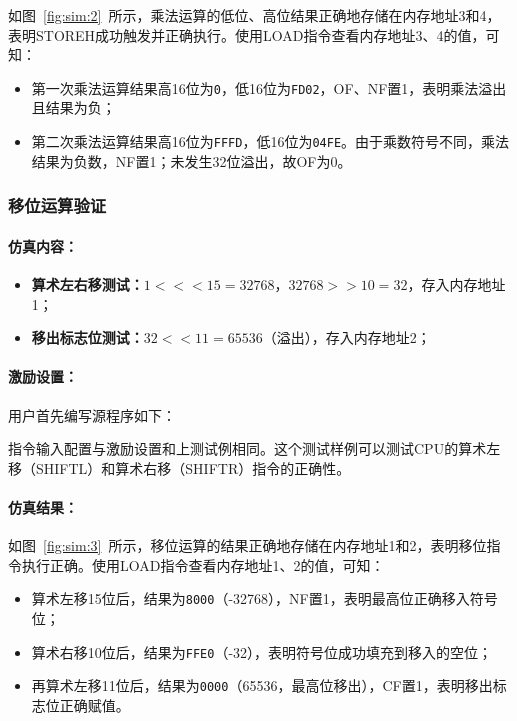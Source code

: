\documentclass[lang=cn,a4paper,newtx]{elegantpaper}
\begin{document}
如图~\ref{fig:sim:2}~所示，乘法运算的低位、高位结果正确地存储在内存地址3和4，表明STOREH成功触发并正确执行。使用LOAD指令查看内存地址3、4的值，可知：
\begin{itemize}
  \item 第一次乘法运算结果高16位为\texttt{0}，低16位为\texttt{FD02}，OF、NF置1，表明乘法溢出且结果为负；
  \item 第二次乘法运算结果高16位为\texttt{FFFD}，低16位为\texttt{04FE}。由于乘数符号不同，乘法结果为负数，NF置1；未发生32位溢出，故OF为0。
\end{itemize}
\subsubsection{移位运算验证}
\paragraph{仿真内容：}
\begin{itemize}
  \item \textbf{算术左右移测试：}$1 <<< 15 = 32768$，$32768 >> 10 = 32$，存入内存地址1；
  \item \textbf{移出标志位测试：}$32 << 11 = 65536$（溢出），存入内存地址2；
\end{itemize}



\paragraph{激励设置：}

用户首先编写源程序如下：


指令输入配置与激励设置和上测试例相同。这个测试样例可以测试CPU的算术左移（SHIFTL）和算术右移（SHIFTR）指令的正确性。

\paragraph{仿真结果：}

如图~\ref{fig:sim:3}~所示，移位运算的结果正确地存储在内存地址1和2，表明移位指令执行正确。使用LOAD指令查看内存地址1、2的值，可知：
\begin{itemize}
  \item 算术左移15位后，结果为\texttt{8000}（-32768），NF置1，表明最高位正确移入符号位；
  \item 算术右移10位后，结果为\texttt{FFE0}（-32），表明符号位成功填充到移入的空位；
  \item 再算术左移11位后，结果为\texttt{0000}（65536，最高位移出），CF置1，表明移出标志位正确赋值。
\end{itemize}
\end{document}
